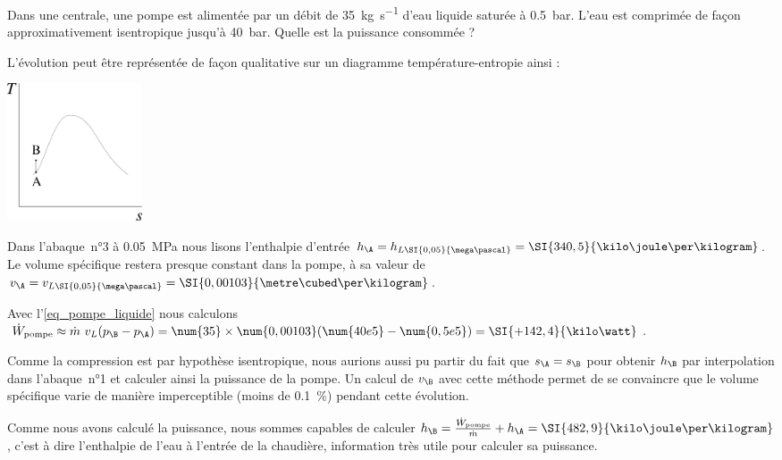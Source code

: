		 	\begin{anexample}
		 	\label{exemple_pompe_centrale}
		 		Dans une centrale, une pompe est alimentée par un débit de \SI{35}{\kilogram\per\second} d’eau liquide saturée à \SI{0,5}{\bar}. L’eau est comprimée de façon approximativement isentropique jusqu’à \SI{40}{\bar}. Quelle est la puissance consommée ?
		 			\begin{answer}
			 			L’évolution peut être représentée de façon qualitative sur un diagramme température-entropie ainsi :
						\begin{center}\includegraphics[width=4cm]{images/exe_ts_pompe.png}\end{center}
		 				Dans l’abaque~n°3 à \SI{0,05}{\mega\pascal} nous lisons l’enthalpie d’entrée $h_\A = h_{L \SI{0,05}{\mega\pascal}} = \SI{340,5}{\kilo\joule\per\kilogram}$. Le volume spécifique restera presque constant dans la pompe, à sa valeur de $v_\A = v_{L \SI{0,05}{\mega\pascal}} = \SI{0,00103}{\metre\cubed\per\kilogram}$. 
		 				
		 				Avec l’\cref{eq_pompe_liquide} nous calculons $\dot W_\text{pompe} \approx \dot m \ v_L (p_\B - p_\A ) = \num{35} \times \num{0,00103} (\num{40e5} - \num{0,5e5}) = \SI{+142,4}{\kilo\watt}$.
		 				
		 					\begin{remark}Comme la compression est par hypothèse isentropique, nous aurions aussi pu partir du fait que $s_\A = s_\B$ pour obtenir $h_\B$ par interpolation dans l’abaque~n°1 et calculer ainsi la puissance de la pompe. Un calcul de $v_\B$ avec cette méthode permet de se convaincre que le volume spécifique varie de manière imperceptible (moins de \SI{0,1}{\percent}) pendant cette évolution.\end{remark}
		 					\begin{remark}Comme nous avons calculé la puissance, nous sommes capables de calculer $h_\B = \frac{\dot W_\text{pompe}}{\dot m} + h_\A = \SI{482,9}{\kilo\joule\per\kilogram}$, c’est à dire l’enthalpie de l’eau à l’entrée de la chaudière, information très utile pour calculer sa puissance.\end{remark}
		 			\end{answer}
		 	\end{anexample}

